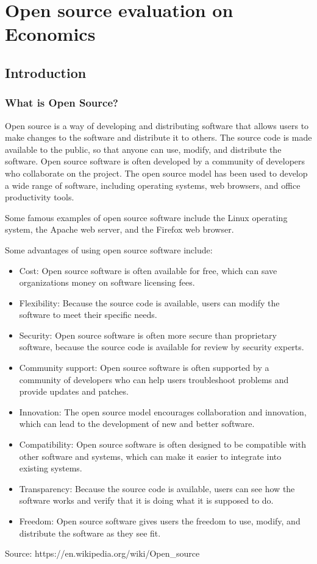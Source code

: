 \chapter{Open source evaluation on Economics}
\label{cha:Open_source_evaluation_Economics}

\section{Introduction}

\subsection{What is Open Source?}

Open source is a way of developing and distributing software that allows users to make changes to the software and distribute it to others. The source code is made available to the public, so that anyone can use, modify, and distribute the software. 
Open source software is often developed by a community of developers who collaborate on the project. 
The open source model has been used to develop a wide range of software, including operating systems, web browsers, and office productivity tools.

Some famous examples of open source software include the Linux operating system, the Apache web server, and the Firefox web browser.

Some advantages of using open source software include:
\begin{itemize}
    \item Cost: Open source software is often available for free, which can save organizations money on software licensing fees.
    \item Flexibility: Because the source code is available, users can modify the software to meet their specific needs.
    \item Security: Open source software is often more secure than proprietary software, because the source code is available for review by security experts.
    \item Community support: Open source software is often supported by a community of developers who can help users troubleshoot problems and provide updates and patches.
    \item Innovation: The open source model encourages collaboration and innovation, which can lead to the development of new and better software.
    \item Compatibility: Open source software is often designed to be compatible with other software and systems, which can make it easier to integrate into existing systems.
    \item Transparency: Because the source code is available, users can see how the software works and verify that it is doing what it is supposed to do.
    \item Freedom: Open source software gives users the freedom to use, modify, and distribute the software as they see fit.
\end{itemize}



Source: https://en.wikipedia.org/wiki/Open_source